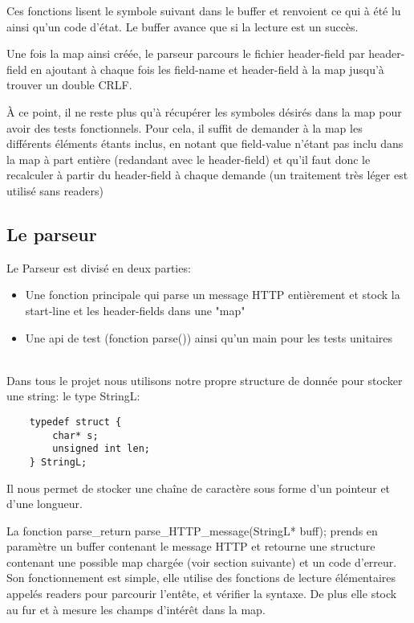 \documentclass{article}
\begin{document}
        Ces fonctions lisent le symbole suivant dans le buffer et renvoient ce qui à été lu ainsi qu'un code d'état. Le buffer avance que si la lecture est un succès.
        
        Une fois la map ainsi créée, le parseur parcours le fichier header-field par header-field en ajoutant à chaque fois les field-name et header-field à la map jusqu'à trouver un double CRLF.
        
       À ce point, il ne reste plus qu'à récupérer les symboles désirés dans la map pour avoir des tests fonctionnels. Pour cela, il suffit de demander à la map les différents éléments étants inclus, en notant que field-value n'étant pas inclu dans la map à part entière (redandant avec le header-field) et qu'il faut donc le recalculer à partir du header-field à chaque demande (un traitement très léger est utilisé sans readers)
        
        
        \subsection{Le parseur} %
        Le Parseur est divisé en deux parties:\\
            \begin{itemize}
                \item Une fonction principale qui parse un message HTTP entièrement et stock la start-line et les header-fields dans une "map"
                \item Une api de test (fonction parse()) ainsi qu'un main pour les tests unitaires
            \end{itemize}
            
            ~~\\
            
            Dans tous le projet nous utilisons notre propre structure de donnée pour stocker une string: le type StringL:
            
            \begin{lstlisting}
    typedef struct {
        char* s;
        unsigned int len;
    } StringL;
            \end{lstlisting}
            
            Il nous permet de stocker une chaîne de caractère sous forme d'un pointeur et d'une longueur.
            
            La fonction parse\_return parse\_HTTP\_message(StringL* buff); prends en paramètre un buffer contenant le message HTTP et retourne une structure contenant une possible map chargée (voir section suivante) et un code d'erreur.
            Son fonctionnement est simple, elle utilise des fonctions de lecture élémentaires appelés readers pour parcourir l'entête, et vérifier la syntaxe. De plus elle stock au fur et à mesure les champs d'intérêt dans la map.
            
\end{document}
